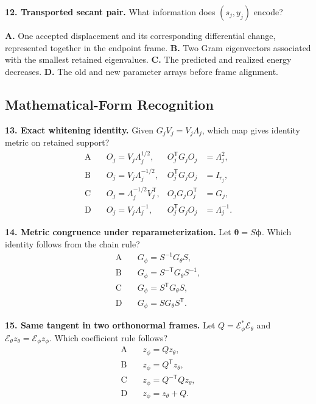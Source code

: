\documentclass[10pt,twocolumn]{article}
\begin{document}
\textbf{12. Transported secant pair.}
What information does \((s_j,y_j)\) encode?

\textbf{A.} One accepted displacement and its corresponding differential
change, represented together in the endpoint frame.\quad
\textbf{B.} Two Gram eigenvectors associated with the smallest retained
eigenvalues.\quad
\textbf{C.} The predicted and realized energy decreases.\quad
\textbf{D.} The old and new parameter arrays before frame alignment.

\subsection*{Mathematical-Form Recognition}

\textbf{13. Exact whitening identity.}
Given \(G_jV_j=V_j\Lambda_j\), which map gives identity metric on retained
support?
\[
\begin{aligned}
\mathrm{A}\quad&O_j=V_j\Lambda_j^{1/2},
&O_j^{\mathsf T}G_jO_j&=\Lambda_j^2,\\
\mathrm{B}\quad&O_j=V_j\Lambda_j^{-1/2},
&O_j^{\mathsf T}G_jO_j&=I_{r_j},\\
\mathrm{C}\quad&O_j=\Lambda_j^{-1/2}V_j^{\mathsf T},
&O_jG_jO_j^{\mathsf T}&=G_j,\\
\mathrm{D}\quad&O_j=V_j\Lambda_j^{-1},
&O_j^{\mathsf T}G_jO_j&=\Lambda_j^{-1}.
\end{aligned}
\]

\textbf{14. Metric congruence under reparameterization.}
Let \(\bm\theta=S\bm\phi\). Which identity follows from the chain rule?
\[
\begin{aligned}
\mathrm{A}\quad&G_\phi=S^{-1}G_\theta S,\\
\mathrm{B}\quad&G_\phi=S^{-\mathsf T}G_\theta S^{-1},\\
\mathrm{C}\quad&G_\phi=S^{\mathsf T}G_\theta S,\\
\mathrm{D}\quad&G_\phi=SG_\theta S^{\mathsf T}.
\end{aligned}
\]

\textbf{15. Same tangent in two orthonormal frames.}
Let \(Q=\mathcal E_\phi^*\mathcal E_\theta\) and
\(\mathcal E_\theta z_\theta=\mathcal E_\phi z_\phi\). Which coefficient rule
follows?
\[
\begin{aligned}
\mathrm{A}\quad&z_\phi=Qz_\theta,\\
\mathrm{B}\quad&z_\phi=Q^{\mathsf T}z_\theta,\\
\mathrm{C}\quad&z_\phi=Q^{-\mathsf T}Qz_\theta,\\
\mathrm{D}\quad&z_\phi=z_\theta+Q.
\end{aligned}
\]
\end{document}
